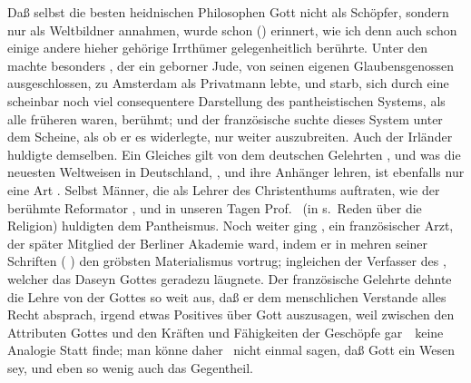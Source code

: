 \begin{aufza}
\item Daß selbst die besten heidnischen Philosophen Gott nicht als Schöpfer, sondern nur als Weltbildner annahmen, wurde schon () erinnert, wie ich denn auch schon einige andere hieher gehörige Irrthümer gelegenheitlich berührte. Unter den  machte besonders , der ein geborner Jude, von seinen eigenen Glaubensgenossen ausgeschlossen, zu Amsterdam als Privatmann lebte, und  starb, sich durch eine scheinbar noch viel consequentere Darstellung des pantheistischen Systems, als alle früheren waren, berühmt; und der französische  suchte dieses System unter dem Scheine, als ob er es widerlegte, nur weiter auszubreiten. Auch der Irländer  huldigte demselben. Ein Gleiches gilt von dem deutschen Gelehrten , und was die neuesten Weltweisen in Deutschland, ,  und ihre Anhänger lehren, ist ebenfalls nur eine Art . Selbst Männer, die als Lehrer des Christenthums auftraten, wie der berühmte Reformator , und in unseren Tagen Prof.~ (in s.~Reden über die Religion) huldigten dem Pantheismus. Noch weiter ging , ein französischer Arzt, der später Mitglied der Berliner Akademie ward, indem er in mehren seiner Schriften ( \usw ) den gröbsten Materialismus vortrug; ingleichen der Verfasser des , welcher das Daseyn Gottes geradezu läugnete. Der französische Gelehrte  dehnte die Lehre von der  Gottes so weit aus, daß er dem menschlichen Verstande alles Recht absprach, irgend etwas Positives über Gott auszusagen, weil zwischen den Attributen Gottes und den Kräften und Fähigkeiten der Geschöpfe gar~\ keine Analogie Statt finde; man könne daher \zB\ nicht einmal sagen, daß Gott ein  Wesen sey, und eben so wenig auch das Gegentheil.
\end{aufza}
   
